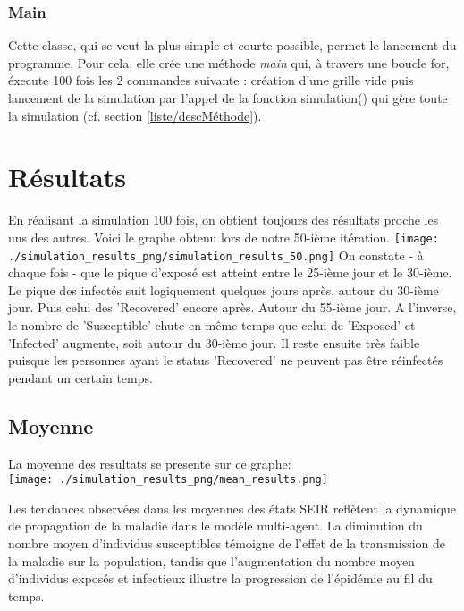 \documentclass[french]{article}
\begin{document}


\subsubsection{Main}
Cette classe, qui se veut la plus simple et courte possible, permet le lancement du programme. Pour cela, elle crée une méthode \textit{main} qui, à travers une boucle for, éxecute 100 fois les 2 commandes suivante : création d'une grille vide puis lancement de la simulation par l'appel de la fonction simulation() qui gère toute la simulation (cf. section \ref{liste/descMéthode}).



\section{Résultats}
En réalisant la simulation 100 fois, on obtient toujours des résultats proche les uns des autres. Voici le graphe obtenu lors de notre 50-ième itération. \newline
\texttt{[image: ./simulation\_results\_png/simulation\_results\_50.png]} On constate - à chaque fois - que le pique d'exposé est atteint entre le 25-ième jour et le 30-ième. Le pique des infectés suit logiquement quelques jours après, autour du 30-ième jour. Puis celui des 'Recovered' encore après. Autour du 55-ième jour. A l'inverse, le nombre de 'Susceptible' chute en même temps que celui de 'Exposed' et 'Infected' augmente, soit autour du 30-ième jour. Il reste ensuite très faible puisque les personnes ayant le status 'Recovered' ne peuvent pas être réinfectés pendant un certain temps.

\newpage

\subsection{Moyenne}

La moyenne des resultats se presente sur ce graphe:\\

\texttt{[image: ./simulation\_results\_png/mean\_results.png]}

Les tendances observées dans les moyennes des états SEIR reflètent la dynamique de propagation de la maladie dans le modèle multi-agent. La diminution du nombre moyen d'individus susceptibles témoigne de l'effet de la transmission de la maladie sur la population, tandis que l'augmentation du nombre moyen d'individus exposés et infectieux illustre la progression de l'épidémie au fil du temps.
\end{document}
